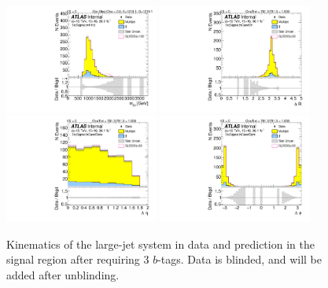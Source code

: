 \begin{figure}[htbp!]
\begin{center}
\includegraphics[width=0.45\textwidth,angle=-90]{figures/boosted/Signal/b77_ThreeTag_Signal_mHH_l_blind.pdf}
\includegraphics[width=0.45\textwidth,angle=-90]{figures/boosted/Signal/b77_ThreeTag_Signal_hCandDr_blind.pdf}\\
\includegraphics[width=0.45\textwidth,angle=-90]{figures/boosted/Signal/b77_ThreeTag_Signal_hCandDeta_blind.pdf}
\includegraphics[width=0.45\textwidth,angle=-90]{figures/boosted/Signal/b77_ThreeTag_Signal_hCandDphi_blind.pdf}
  \caption{Kinematics of the large-\R jet system in data and prediction in the signal region after requiring 3 $b$-tags. Data is blinded, and will be added after unblinding. }
  \label{fig:boosted-3b-signal-blind-ak10-system}
\end{center}
\end{figure}

